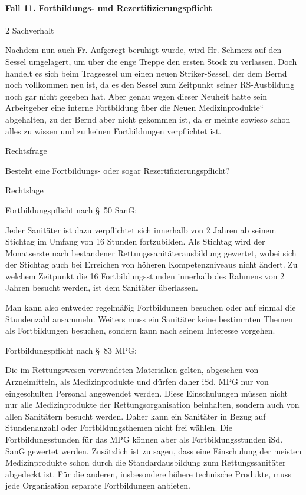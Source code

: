 \documentclass{article}
\begin{document}
\paragraph[Fall 11. Fortbildungs- und Rezertifizierungspflicht]{Fall 11.
Fortbildungs- und Rezertifizierungspflicht}
\begin{multicols}{2}
Sachverhalt

Nachdem nun auch Fr. Aufgeregt beruhigt wurde, wird Hr. Schmerz auf den
Sessel umgelagert, um \"uber die enge Treppe den ersten Stock zu
verlassen. Doch handelt es sich beim Tragsessel um einen neuen
Striker-Sessel, der dem Bernd noch vollkommen neu ist, da es den Sessel
zum Zeitpunkt seiner RS-Ausbildung noch gar nicht gegeben hat. Aber
genau wegen dieser Neuheit hatte sein Arbeitgeber eine interne
Fortbildung \"uber die {\quotedblbase}Neuen
Medizinprodukte{\textquotedblleft} abgehalten, zu der Bernd aber nicht
gekommen ist, da er meinte sowieso schon alles zu wissen und zu keinen
Fortbildungen verpflichtet ist.

Rechtsfrage

Besteht eine Fortbildungs- oder sogar Re\-zertifizierungspflicht?

Rechtslage

Fortbildungspflicht nach {\S}~50 SanG:

Jeder Sanit\"ater ist dazu verpflichtet sich innerhalb von 2 Jahren ab
seinem Stichtag im Umfang von 16 Stunden fortzubilden. Als Stichtag
wird der Monatserste nach bestandener Rettungssanit\"aterausbildung
gewertet, wobei sich der Stichtag auch bei Erreichen von h\"oheren
Kompetenzniveaus nicht \"andert. Zu welchem Zeitpunkt die 16
Fortbildungsstunden innerhalb des Rahmens von 2 Jahren besucht werden,
ist dem Sanit\"ater \"uberlassen. 

Man kann also entweder regelm\"a{\ss}ig Fortbildungen besuchen oder auf
einmal die Stundenzahl ansammeln. Weiters muss ein Sanit\"ater keine
bestimmten Themen als Fortbildungen besuchen, sondern kann nach seinem
Interesse vorgehen.

Fortbildungspflicht nach {\S}~83 MPG:

Die im Rettungswesen verwendeten Materialien gelten, abgesehen von
Arzneimitteln, als Medizinprodukte und d\"urfen daher iSd. MPG nur von
eingeschulten Personal angewendet werden. Diese Einschulungen m\"ussen
nicht nur alle Medizinprodukte der Rettungsorganisation beinhalten,
sondern auch von allen Sanit\"atern besucht werden. Daher kann ein
Sanit\"ater in Bezug auf Stundenanzahl oder Fortbildungsthemen nicht
frei w\"ahlen. Die Fortbildungsstunden f\"ur das MPG k\"onnen aber als
Fortbildungsstunden iSd. SanG gewertet werden. Zus\"atzlich ist zu
sagen, dass eine Einschulung der meisten Medizinprodukte schon durch
die Standardausbildung zum Rettungs\-sani\-t\"ater abgedeckt ist. F\"ur
die anderen, insbesondere h\"ohere technische Produkte, muss jede
Org\-anisation separate Fortbildungen anbieten.


\end{multicols}
\end{document}
